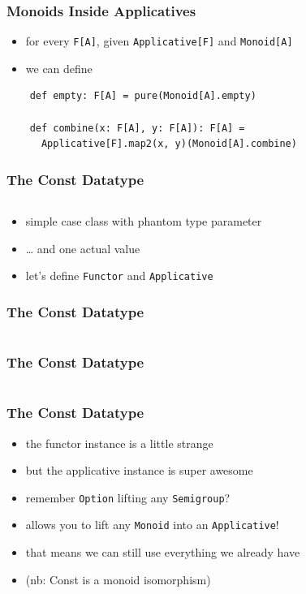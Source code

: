 \documentclass[aspectratio=169]{beamer}
\begin{document}
\begin{frame}[fragile]
  \frametitle{Monoids Inside Applicatives}
  \begin{itemize}
  \item for every \texttt{F[A]}, given \texttt{Applicative[F]} and \texttt{Monoid[A]}
  \item we can define
  \end{itemize}

  \begin{verbatim}
    def empty: F[A] = pure(Monoid[A].empty)

    def combine(x: F[A], y: F[A]): F[A] =
      Applicative[F].map2(x, y)(Monoid[A].combine)
  \end{verbatim}
\end{frame}

\begin{frame}[fragile]
  \frametitle{The Const Datatype}
  \begin{center}
    \inputminted[fontsize=\small]{scala}{snippets/const-def.scala}
  \end{center}
  \vspace{1cm}
  \begin{itemize}
  \item simple case class with phantom type parameter
  \item \ldots{} and one actual value
  \item let's define \texttt{Functor} and \texttt{Applicative}
  \end{itemize}
\end{frame}

\begin{frame}[fragile]
  \frametitle{The Const Datatype}
  \begin{center}
    \inputminted[fontsize=\small]{scala}{snippets/const-try-applicative.scala}
  \end{center}
\end{frame}

\begin{frame}[fragile]
  \frametitle{The Const Datatype}
  \begin{center}
    \inputminted[fontsize=\small, highlightlines={1,8,12}]{scala}{snippets/const-applicative.scala}
  \end{center}
\end{frame}

\begin{frame}
  \frametitle{The Const Datatype}
  \begin{itemize}
  \item the functor instance is a little strange
  \item but the applicative instance is super awesome
  \item remember \texttt{Option} lifting any \texttt{Semigroup}?
  \item allows you to lift any \texttt{Monoid} into an \texttt{Applicative}!
  \item that means we can still use everything we already have
  \item (nb: Const is a monoid isomorphism)
  \end{itemize}
\end{frame}
\end{document}
